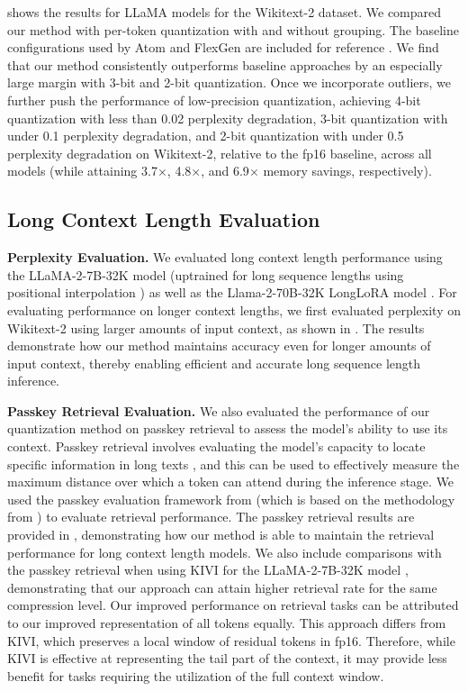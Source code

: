  shows the results for LLaMA models for the Wikitext-2 dataset. We compared our method with per-token quantization with and without grouping. The baseline configurations used by Atom and FlexGen are included for reference \cite{zhao2023atom,sheng2023flexgen}. We find that our method consistently outperforms baseline approaches by an especially large margin with 3-bit and 2-bit quantization. Once we incorporate outliers, we further push the performance of low-precision quantization, achieving 4-bit quantization with less than 0.02 perplexity degradation, 3-bit quantization with under 0.1 perplexity degradation, and 2-bit quantization with under 0.5 perplexity degradation on Wikitext-2, relative to the fp16 baseline, across all models (while attaining 3.7$\times$, 4.8$\times$, and 6.9$\times$ memory savings, respectively).

\subsection{Long Context Length Evaluation}

\textbf{Perplexity Evaluation.} We evaluated long context length performance using the LLaMA-2-7B-32K model (uptrained for long sequence lengths using positional interpolation \cite{chen2023extending}) as well as the Llama-2-70B-32K LongLoRA model \cite{chen2023longlora}. For evaluating performance on longer context lengths, we first evaluated perplexity on Wikitext-2 using larger amounts of input context, as shown in  \cite{chen2023longlora,han2023lminfinite}. The results demonstrate how our method maintains accuracy even for longer amounts of input context, thereby enabling efficient and accurate long sequence length inference.

\textbf{Passkey Retrieval Evaluation.} We also evaluated the performance of our quantization method on passkey retrieval to assess the model's ability to use its context. Passkey retrieval involves evaluating the model’s capacity to locate specific information in long texts \cite{longchat2023}, and this can be used to effectively measure the maximum distance over which a token can attend during the inference stage. We used the passkey evaluation framework from \cite{zhu2023pose} (which is based on the methodology from \cite{mohtashami2023landmark}) to evaluate retrieval performance. The passkey retrieval results are provided in , demonstrating how our method is able to maintain the retrieval performance for long context length models. We also include comparisons with the passkey retrieval when using KIVI for the LLaMA-2-7B-32K model \cite{kivi}, demonstrating that our approach can attain higher retrieval rate for the same compression level. Our improved performance on retrieval tasks can be attributed to our improved representation of all tokens equally. This approach differs from KIVI, which preserves a local window of residual tokens in fp16. Therefore, while KIVI is effective at representing the tail part of the context, it may provide less benefit for tasks requiring the utilization of the full context window.

